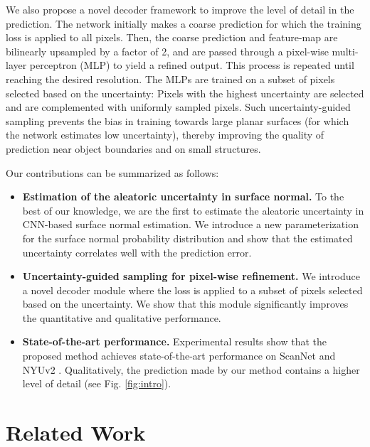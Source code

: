 \documentclass[10pt,twocolumn,letterpaper]{article}
\begin{document}
We also propose a novel decoder framework to improve the level of detail in the prediction. The network initially makes a coarse prediction for which the training loss is applied to all pixels. Then, the coarse prediction and feature-map are bilinearly upsampled by a factor of 2, and are passed through a pixel-wise multi-layer perceptron (MLP) to yield a refined output. This process is repeated until reaching the desired resolution. The MLPs are trained on a subset of pixels selected based on the uncertainty: Pixels with the highest uncertainty are selected and are complemented with uniformly sampled pixels. Such uncertainty-guided sampling prevents the bias in training towards large planar surfaces (for which the network estimates low uncertainty), thereby improving the quality of prediction near object boundaries and on small structures. 

Our contributions can be summarized as follows:

\begin{itemize}
    \item \textbf{Estimation of the aleatoric uncertainty in surface normal.} To the best of our knowledge, we are the first to estimate the aleatoric uncertainty in CNN-based surface normal estimation. We introduce a new parameterization for the surface normal probability distribution and show that the estimated uncertainty correlates well with the prediction error.
    
    \item \textbf{Uncertainty-guided sampling for pixel-wise refinement.} We introduce a novel decoder module where the loss is applied to a subset of pixels selected based on the uncertainty. We show that this module significantly improves the quantitative and qualitative performance.

    \item \textbf{State-of-the-art performance.} Experimental results show that the proposed method achieves state-of-the-art performance on ScanNet \cite{ScanNet} and NYUv2 \cite{NYUv2}. Qualitatively, the prediction made by our method contains a higher level of detail (see Fig. \ref{fig:intro}).
\end{itemize}

\section{Related Work}
\label{sec:related_work}
\end{document}
